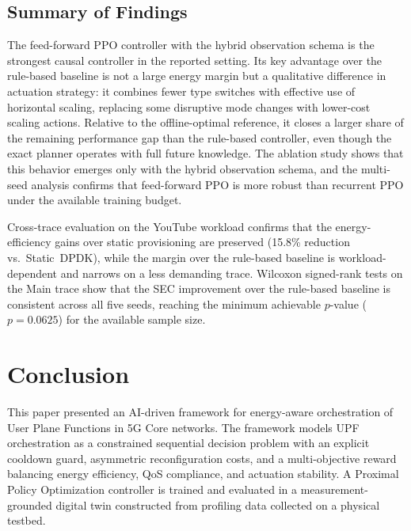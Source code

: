 \documentclass[a4paper,fleqn]{cas-sc}
\begin{document}
\subsection{Summary of Findings}
\label{subsec:results_summary}

The feed-forward PPO controller with the hybrid observation schema is the strongest causal controller in the reported setting. Its key advantage over the rule-based baseline is not a large energy margin but a qualitative difference in actuation strategy: it combines fewer type switches with effective use of horizontal scaling, replacing some disruptive mode changes with lower-cost scaling actions. Relative to the offline-optimal reference, it closes a larger share of the remaining performance gap than the rule-based controller, even though the exact planner operates with full future knowledge. The ablation study shows that this behavior emerges only with the hybrid observation schema, and the multi-seed analysis confirms that feed-forward PPO is more robust than recurrent PPO under the available training budget.

Cross-trace evaluation on the YouTube workload confirms that the energy-efficiency gains over static provisioning are preserved (15.8\% reduction vs.\ Static~DPDK), while the margin over the rule-based baseline is workload-dependent and narrows on a less demanding trace. Wilcoxon signed-rank tests on the Main trace show that the SEC improvement over the rule-based baseline is consistent across all five seeds, reaching the minimum achievable $p$-value ($p=0.0625$) for the available sample size.


\section{Conclusion}
\label{conclusion}

This paper presented an AI-driven framework for energy-aware orchestration of User Plane Functions in 5G Core networks. The framework models UPF orchestration as a constrained sequential decision problem with an explicit cooldown guard, asymmetric reconfiguration costs, and a multi-objective reward balancing energy efficiency, QoS compliance, and actuation stability. A Proximal Policy Optimization controller is trained and evaluated in a measurement-grounded digital twin constructed from profiling data collected on a physical testbed.
\end{document}
